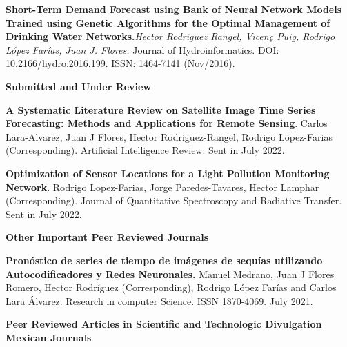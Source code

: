 \documentclass[10pt]{article}
\newenvironment{innerlist}[1][\enskip\textbullet]%
        {\begin{compactitem}[#1]}{\end{compactitem}}
\newcommand{\blankline}{\quad\pagebreak[2]}
\begin{document}
\begin{innerlist}
\item \textbf{Short-Term Demand Forecast using Bank of Neural Network Models Trained using Genetic Algorithms for the Optimal Management of Drinking Water Networks.}\textit{Hector Rodriguez Rangel, Vicen\c{c} Puig, Rodrigo López Farías, Juan J. Flores.}  {Journal of Hydroinformatics}. DOI: 10.2166/hydro.2016.199. ISSN: 1464-7141 (Nov/2016).

\blankline




\textbf{Submitted and Under Review}
\begin{innerlist}
\item \textbf{A Systematic Literature Review on Satellite Image Time Series Forecasting: Methods and Applications for Remote Sensing}. Carlos Lara-Alvarez, Juan J Flores, 
Hector Rodriguez-Rangel, Rodrigo Lopez-Farias (Corresponding). Artificial Intelligence Review. Sent in July 2022.
\item  \textbf{Optimization of Sensor Locations for a Light Pollution Monitoring Network}.  Rodrigo Lopez-Farias, Jorge Paredes-Tavares, Hector Lamphar   (Corresponding).  Journal of Quantitative Spectroscopy and Radiative Transfer. Sent in July 2022.
\end{innerlist}

\blankline


\textbf{Other Important Peer Reviewed Journals}

\begin{innerlist}
\item \textbf{Pronóstico de series de tiempo de imágenes de sequías utilizando Autocodificadores y Redes Neuronales.} Manuel Medrano, Juan J Flores Romero, Hector Rodríguez (Corresponding), Rodrigo López Farías and Carlos Lara Álvarez. Research in computer Science. ISSN 1870-4069. July 2021.
\end{innerlist}

\blankline



\textbf{Peer Reviewed Articles in Scientific and Technologic Divulgation Mexican Journals }



\end{innerlist}
\end{document}
